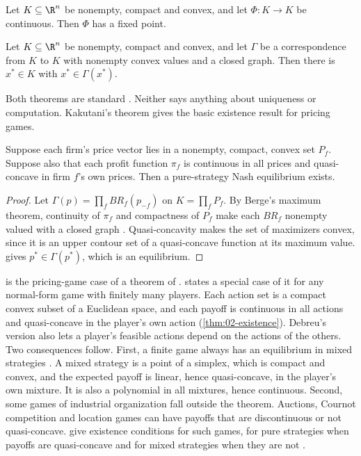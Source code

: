 \begin{theorem}[Brouwer]\label{thm:B-brouwer}
Let $K \subseteq \R^n$ be nonempty, compact and convex, and let $\Phi: K \to K$ be continuous. Then $\Phi$ has
a fixed point.
\end{theorem}

\begin{theorem}[Kakutani]\label{thm:B-kakutani}
Let $K \subseteq \R^n$ be nonempty, compact and convex, and let $\Gamma$ be a correspondence from $K$ to $K$
with nonempty convex values and a closed graph. Then there is $x^* \in K$ with $x^* \in \Gamma(x^*)$.
\end{theorem}

Both theorems are standard \citep{Brouwer1912, Kakutani1941, MasColellWhinstonGreen1995}. Neither says
anything about uniqueness or computation. Kakutani's theorem gives the basic existence result for pricing
games.

\begin{corollary}\label{cor:B-nash-existence}
Suppose each firm's price vector lies in a nonempty, compact, convex set $P_f$. Suppose also that each
profit function $\pi_f$ is continuous in all prices and quasi-concave in firm $f$'s own prices. Then a
pure-strategy Nash equilibrium exists.
\end{corollary}

\begin{proof}
Let $\Gamma(p) = \prod_fBR_f(p_{-f})$ on $K = \prod_fP_f$. By Berge's maximum theorem, continuity of
$\pi_f$ and compactness of $P_f$ make each $BR_f$ nonempty valued with a closed graph
\citep{MasColellWhinstonGreen1995}. Quasi-concavity makes the set of maximizers convex, since it is an upper
contour set of a quasi-concave function at its maximum value.  gives $p^* \in
\Gamma(p^*)$, which is an equilibrium.
\end{proof}

 is the pricing-game case of a theorem of \citet{Debreu1952}.
\citet[Section~11.6.1]{Tirole1988} states a special case of it for any normal-form game with finitely many
players. Each action set is a compact convex subset of a Euclidean space, and each payoff is continuous in all
actions and quasi-concave in the player's own action (\cref{thm:02-existence}). Debreu's version also lets a
player's feasible actions depend on the actions of the others. Two consequences follow. First, a finite game
always has an equilibrium in mixed strategies \citep{Nash1950}. A mixed strategy is a point of a simplex, which
is compact and convex, and the expected payoff is linear, hence quasi-concave, in the player's own mixture. It
is also a polynomial in all mixtures, hence continuous. Second, some
games of industrial organization fall outside the theorem. Auctions, Cournot competition and location games can
have payoffs that are discontinuous or not quasi-concave. \citet{DasguptaMaskin1986} give existence conditions
for such games, for pure strategies when payoffs are quasi-concave and for mixed strategies when they are not
\citep[Section~11.6.1]{Tirole1988}.

